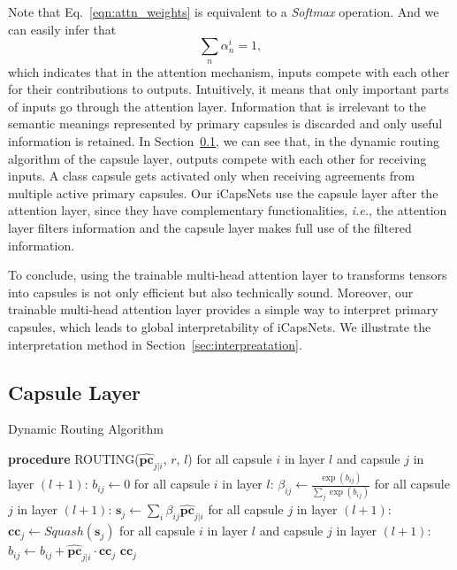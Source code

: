 \documentclass[10pt,journal,compsoc]{IEEEtran}
\begin{document}

Note that Eq.~\eqref{eqn:attn_weights} is equivalent to a \textit{Softmax} operation. And we can easily infer that
\begin{equation}\label{eqn:attn_constraint}
	\sum_{n}\alpha^i_n = 1,
\end{equation}
which indicates that in the attention mechanism, inputs compete with each other for their contributions to outputs. Intuitively, it means that only important parts of inputs go through the attention layer. Information that is irrelevant to the semantic meanings represented by primary capsules is discarded and only useful information is retained. In Section~\ref{sec:capsule}, we can see that, in the dynamic routing algorithm of the capsule layer, outputs compete with each other for receiving inputs. A class capsule gets activated only when receiving agreements from multiple active primary capsules. Our iCapsNets use the capsule layer after the attention layer, since they have complementary functionalities, \emph{i.e.}, the attention layer filters information and the capsule layer makes full use of the filtered information.

To conclude, using the trainable multi-head attention layer to transforms tensors into capsules is not only efficient but also technically sound. Moreover, our trainable multi-head attention layer provides a simple way to interpret primary capsules, which leads to global interpretability of iCapsNets. We illustrate the interpretation method in Section~\ref{sec:interpreatation}.

\subsection{Capsule Layer}\label{sec:capsule}

\begin{algorithm}[t]
	\caption{Dynamic Routing Algorithm~\cite{sabour2017dynamic}}\label{alg:dynamic_routing}
	\begin{algorithmic}[1]
		\STATE \textbf{procedure} ROUTING($\hat{\mathbf{pc}}_{j|i}$, $r$, $l$)
		\STATE for all capsule $i$ in layer $l$ and capsule $j$ in layer $(l+1)$: $b_{ij} \leftarrow 0$
		\STATE for all capsule $i$ in layer $l$: $\beta_{ij} \leftarrow \frac{\exp(b_{ij})}{\sum_{j}\exp(b_{ij})}$ \label{line:caps_weights}
		\STATE for all capsule $j$ in layer $(l+1)$: $\mathbf{s}_j \leftarrow \sum_{i} \beta_{ij} \hat{\mathbf{pc}}_{j|i}$
		\STATE for all capsule $j$ in layer $(l+1)$: $\mathbf{cc}_j \leftarrow Squash (\mathbf{s}_j)$
		\STATE for all capsule $i$ in layer $l$ and capsule $j$ in layer $(l+1)$: $b_{ij} \leftarrow b_{ij} + \hat{\mathbf{pc}}_{j|i} \cdot \mathbf{cc}_j$
		\ENDFOR
		\RETURN $\mathbf{cc}_j$
	\end{algorithmic}
\end{algorithm}
\end{document}
